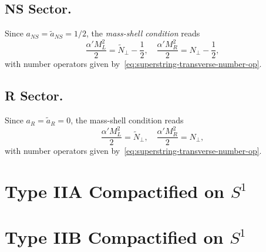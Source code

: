 \subsection{NS Sector.}
Since $a_{NS} = \tilde{a}_{NS} = 1/2$, the \emph{mass-shell condition} reads
\begin{equation}\label{eq:NS-mass-shell}
    \frac{\alpha' M^2_L}{2} = \tilde{N}_\perp - \frac{1}{2},\quad
    \frac{\alpha' M^2_R}{2} = N_\perp - \frac{1}{2},
\end{equation}
with number operators given by~\eqref{eq:superstring-transverse-number-op}.

\subsection{R Sector.}
Since $a_R = \tilde{a}_R = 0$, the mass-shell condition reads
\begin{equation}\label{eq:R-mass-shell}
    \frac{\alpha' M^2_L}{2} = \tilde{N}_\perp,\quad
    \frac{\alpha' M^2_R}{2} = N_\perp,
\end{equation}
with number operators given by~\eqref{eq:superstring-transverse-number-op}.






\section{Type IIA Compactified on \texorpdfstring{$S^1$}{S1}}
\section{Type IIB Compactified on \texorpdfstring{$S^1$}{S1}}